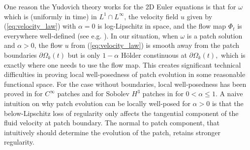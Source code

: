 \documentclass[reqno,centertags, 11pt]{amsart}
\begin{document}
One reason the Yudovich theory works for the 2D Euler equations is that for $\omega$ which is (uniformly in time) in $L^1\cap L^\infty$, the velocity field
$u$ given by (\ref{eq:velocity_law}) with $\alpha=0$ is log-Lipschitz in space, and the flow map $\Phi_t$ is  everywhere well-defined (see e.g. \cite{MB,MP}).
In our situation,
when $\omega$ is a patch solution and $\alpha>0$, the flow $u$ from (\ref{eq:velocity_law}) is smooth away from the patch boundaries  $\partial\Omega_k(t)$ but is only
$1-\alpha$ H\"older constinuous at $\partial\Omega_k(t),$ which is exactly where one needs to use the flow map.
This creates significant technical difficulties in proving
local well-posedness of patch evolution in some reasonable functional space. For the case without boundaries, local well-posedness has been proved in \cite{Rodrigo}
for $C^\infty$ patches and for Sobolev $H^3$ patches in \cite{g} for $0<\alpha \leq 1.$ A naive intuition on why patch evolution can be locally well-posed for $\alpha >0$ is that
the below-Lipschitz loss of regularity only affects the tangential component of the fluid velocity at patch boundary. The normal to patch component, that intuitively should determine
the evolution of the patch, retains stronger regularity.
\end{document}

